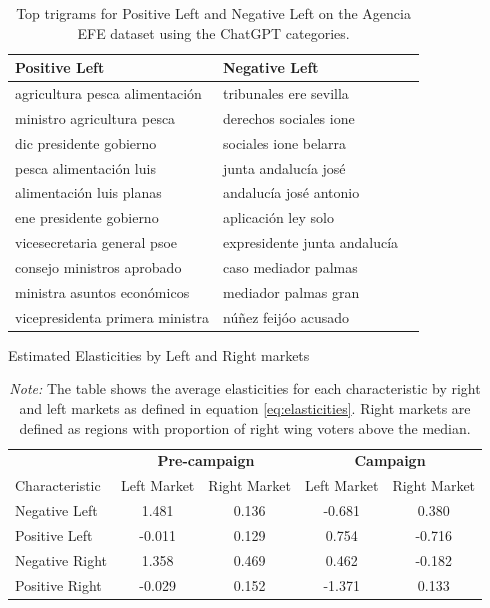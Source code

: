 \documentclass[12pt]{article}
\begin{document}
\begin{table}[ht]
	\centering
	\begin{tabular}{|l|l|l|}
		\hline
		Positive Left & Negative Left \\
		\hline
		agricultura pesca alimentación & tribunales ere sevilla \\
		ministro agricultura pesca & derechos sociales ione \\
		dic presidente gobierno & sociales ione belarra \\
		pesca alimentación luis & junta andalucía josé \\
		alimentación luis planas & andalucía josé antonio \\
		ene presidente gobierno & aplicación ley solo \\
		vicesecretaria general psoe & expresidente junta andalucía \\
		consejo ministros aprobado & caso mediador palmas \\
		ministra asuntos económicos & mediador palmas gran \\
		vicepresidenta primera ministra & núñez feijóo acusado \\
		\hline
	\end{tabular}
	\caption{Top trigrams for Positive Left and Negative Left on the Agencia EFE dataset using the ChatGPT categories.}
	\label{tab:top_words_pos_left_neg_left}
\end{table}
	
	
	
	
	
	
	
	
	
	\begin{table}[ht]
		\label{tab:elasticities}
		\caption{Estimated Elasticities by Left and Right markets}
		\begin{tabular}{l|cc|cc}
			\toprule
			& \multicolumn{2}{c|}{\textbf{Pre-campaign}} & \multicolumn{2}{c}{\textbf{Campaign}} \\
			Characteristic & Left Market & Right Market & Left Market & Right Market \\
			\midrule
			Negative Left & 1.481 & 0.136 & -0.681 & 0.380 \\
			Positive Left & -0.011 & 0.129 & 0.754 & -0.716 \\
			Negative Right & 1.358 & 0.469 & 0.462 & -0.182 \\
			Positive Right & -0.029 & 0.152 & -1.371 & 0.133 \\
			\bottomrule
		\end{tabular}
		\caption*{\textit{Note:} \small The table shows the average elasticities for each characteristic by right and left markets as defined in equation \ref{eq:elasticities}. Right markets are defined as regions with proportion of right wing voters above the median. }
	\end{table}
	
\end{document}

